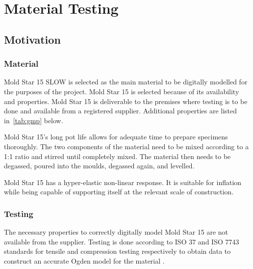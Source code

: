 \chapter{Material Testing}
\label{chp:MT}

\section{Motivation}

\subsection{Material}

Mold Star 15 SLOW is selected as the main material to be digitally modelled for the purposes of the project. Mold Star 15 is selected because of its availability and properties. Mold Star 15 is deliverable to the premises where testing is to be done and available from a registered supplier. Additional properties are listed in~\ref{tab:gmp} below.

\begin{table}[h]
	\centering
	\caption{Given Material Properties \cite{MoldStar}}
	\label{tab:gmp}
\end{table}

Mold Star 15's long pot life allows for adequate time to prepare specimens thoroughly. The two components of the material need to be mixed according to a 1:1 ratio and stirred until completely mixed. The material then needs to be degassed, poured into the moulds, degassed again, and levelled.

Mold Star 15 has a hyper-elastic non-linear response. It is suitable for inflation while being capable of supporting itself at the relevant scale of construction.

\subsection{Testing}

The necessary properties to correctly digitally model Mold Star 15 are not available from the supplier. Testing is done according to ISO 37 and ISO 7743 standards for tensile and compression testing respectively to obtain data to construct an accurate Ogden model for the material \cite{ISO37,ISO7743}.

